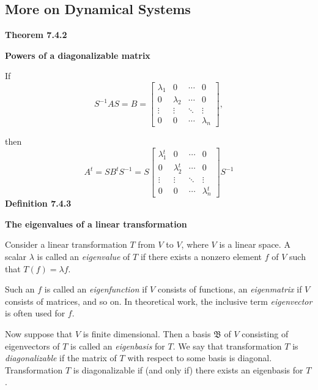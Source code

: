 \subsection{More on Dynamical Systems}
\textbf{Theorem 7.4.2}\\
\par\noindent\textbf{Powers of a diagonalizable matrix}
\par\noindent If
\[S^{-1}AS=B=\left[\begin{array}{cccc}\lambda{}_{1}&0&\cdots{}&0\\ 0&\lambda{}_{2}&\cdots{}&0\\ \vdots{}&\vdots{}&\ddots{}&\vdots{}\\ 0&0&\cdots{}&\lambda{}_{n}\end{array}\right],\]
\par\noindent then
\[A^{t}=SB^{t}S^{-1}=S\left[\begin{array}{cccc}\lambda{}_{1}^{t}&0&\cdots{}&0\\ 0&\lambda{}_{2}^{t}&\cdots{}&0\\ \vdots{}&\vdots{}&\ddots{}&\vdots{}\\ 0&0&\cdots{}&\lambda{}_{n}^{t}\end{array}\right]S^{-1}\]
\textbf{Definition 7.4.3}\\
\par\noindent\textbf{The eigenvalues of a linear transformation}
\par\noindent Consider a linear transformation $T$ from $V$ to $V$, where $V$ is a linear space. A scalar $\lambda{}$ is called an \textit{eigenvalue} of $T$ if there exists a nonzero element $f$ of $V$ such that $T(f)=\lambda{}f$.
\par Such an $f$ is called an \textit{eigenfunction} if $V$ consists of functions, an \textit{eigenmatrix} if $V$ consists of matrices, and so on. In theoretical work, the inclusive term \textit{eigenvector} is often used for $f$.
\par Now suppose that $V$ is finite dimensional. Then a basis $\mathfrak{B}$ of $V$ consisting of eigenvectors of $T$ is called an \textit{eigenbasis} for $T$. We say that transformation $T$ is \textit{diagonalizable} if the matrix of $T$ with respect to some basis is diagonal. Transformation $T$ is diagonalizable if (and only if) there exists an eigenbasis for $T$.


